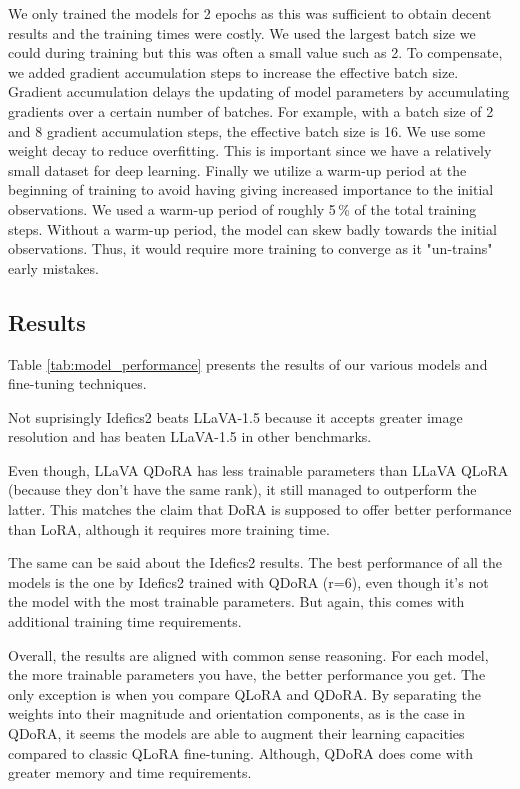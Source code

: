 \documentclass{article}
\begin{document}
We only trained the models for 2 epochs as this was sufficient to obtain decent results and the training times were costly. We used the largest batch size we could during training but this was often a small value such as 2. To compensate, we added gradient accumulation steps to increase the effective batch size. Gradient accumulation delays the updating of model parameters by accumulating gradients over a certain number of batches. For example, with a batch size of 2 and 8 gradient accumulation steps, the effective batch size is 16. We use some weight decay to reduce overfitting. This is important since we have a relatively small dataset for deep learning. Finally we utilize a warm-up period at the beginning of training to avoid having giving increased importance to the initial observations. We used a warm-up period of roughly 5\,\% of the total training steps. Without a warm-up period, the model can skew badly towards the initial observations. Thus, it would require more training to converge as it "un-trains" early mistakes.

\subsection{Results}

Table \ref{tab:model_performance} presents the results of our various models and fine-tuning techniques.


Not suprisingly Idefics2 beats LLaVA-1.5 because it accepts greater image resolution and has beaten LLaVA-1.5 in other benchmarks.\cite{idefics2}

Even though, LLaVA QDoRA has less trainable parameters than LLaVA QLoRA (because they don't have
the same rank), it still managed to outperform the latter. This matches the claim that DoRA
is supposed to offer better performance than LoRA, although it requires more training time.

The same can be said about the Idefics2 results. The best performance of all the models is the one
by Idefics2 trained with QDoRA (r=6), even though it's not the model with the most trainable parameters. But again,
this comes with additional training time requirements.

Overall, the results are aligned with common sense reasoning. For each model, the more trainable parameters you have,
the better performance you get. The only exception is when you compare QLoRA and QDoRA. By separating the weights into
their magnitude and orientation components, as is the case in QDoRA, it seems the models are able
to augment their learning capacities compared to classic QLoRA fine-tuning. Although, QDoRA does come with
greater memory and time requirements.
\end{document}
